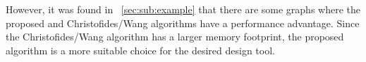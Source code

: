 However, it was found in \sectionname~\ref{sec:sub:example} that there are some graphs where the proposed and
Christofides/Wang algorithms have a performance advantage.  Since the Christofides/Wang algorithm has a larger
memory footprint, the proposed algorithm is a more suitable choice for the desired design tool.
